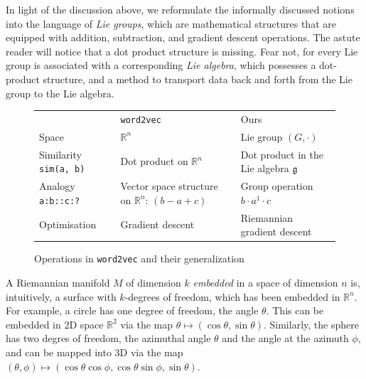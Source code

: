 \documentclass[11pt]{book}
\newcommand{\R}{\ensuremath{\mathbb R}}
\begin{document}
In light of the discussion above, we reformulate the informally discussed
notions into the language of \emph{Lie groups}, which are mathematical structures
that are equipped with addition, subtraction, and gradient descent operations.
The astute reader will notice that a dot product structure is missing. Fear not, for
every Lie group is associated with a corresponding \emph{Lie algebra}, which possesses
a dot-product structure, and a method to transport data back and forth from the Lie group
to the Lie algebra.

\begin{figure}
\label{fig:table-structures-word2vec-vs-ours}
\begin{tabular}{lll}
& \texttt{word2vec} & Ours \\
Space & $\mathbb R^n$ & Lie group $(G, \cdot)$ \\
Similarity \texttt{sim(a, b)}&  Dot product on $\mathbb R^n$ & Dot product in the Lie algebra $\mathfrak g$ \\
Analogy \texttt{a:b::c:?} & Vector space structure on $\mathbb R^n$: $(b - a + c)$ & Group operation $b\cdot a^{1}\cdot c$ \\
Optimisation & Gradient descent & Riemannian gradient descent 
\end{tabular}
\caption{Operations in \texttt{word2vec} and their generalization}
\end{figure}

A Riemannian manifold $M$ of dimension $k$ \emph{embedded} in a space of
dimension $n$ is, intuitively, a surface with $k$-degrees of freedom, which has
been embedded in $\R^n$.  For example, a circle has one degree of freedom, the angle $\theta$.
This can be embedded in 2D space $\mathbb R^2$ via the map $\theta \mapsto (\cos \theta, \sin \theta)$.
Similarly, the sphere has two degres of freedom, the azimuthal angle $\theta$ and the angle
at the azimuth $\phi$, and can be mapped into 3D via the map
$(\theta, \phi) \mapsto (\cos \theta \cos \phi, \cos \theta \sin \phi, \sin \theta)$.
\end{document}
